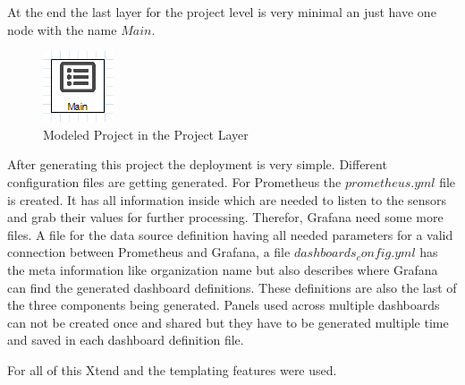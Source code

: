 At the end the last layer for the project level is very minimal an just have one node with the name $Main$.

\begin{figure}[H]
	\centering
	\includegraphics{assets/images/projectLayer}
	\caption{Modeled Project in the Project Layer}
\end{figure}

After generating this project the  deployment is very simple. Different configuration files are getting generated. For Prometheus the $prometheus.yml$ file is created. It has all information inside which are needed to listen to the sensors and grab their values for further processing. Therefor, Grafana need some more files. A file for the data source definition having all needed parameters for a valid connection between Prometheus and Grafana, a file $dashboards_config.yml$ has the meta information like organization name but also describes where Grafana can find the generated dashboard definitions. These definitions are also the last of the three components being generated. Panels used across multiple dashboards can not be created once and shared but they have to be generated multiple time and saved in each dashboard definition file.

For all of this Xtend and the templating features were used. 

